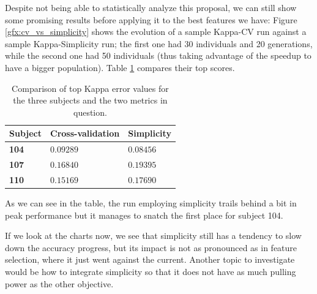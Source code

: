 	Despite not being able to statistically analyze this proposal, we can still show some promising results before applying it to the best features we have: Figure \ref{gfx:cv_vs_simplicity} shows the evolution of a sample Kappa-CV run against a sample Kappa-Simplicity run; the first one had 30 individuals and 20 generations, while the second one had 50 individuals (thus taking advantage of the speedup to have a bigger population). Table \ref{table:best_cv_vs_simplicity} compares their top scores.

	\vspace{0.3cm}

	\begin{table}[h]

        \centering
        \setlength\arrayrulewidth{0.8pt}

        \begin{tabular}{| >{\centering\arraybackslash}m{0.5in} | >{\centering\arraybackslash}m{1.2in} | >{\centering\arraybackslash}m{1.2in} |}

            \hline
            \rowcolor{RoyalBlue}
            \textbf{Subject} & \textbf{Cross-validation} & \textbf{Simplicity} \\
            \hline
            \textbf{104} & $0.09289$ & $0.08456$ \\
            \hline
            \textbf{107} & $0.16840$ & $0.19395$ \\
            \hline
            \textbf{110} & $0.15169$ & $0.17690$ \\
            \hline

        \end{tabular}

        \caption[Best Kappa values using cross-validation and simplicity]{Comparison of top Kappa error values for the three subjects and the two metrics in question.}\label{table:best_cv_vs_simplicity}

    \end{table}

\newpage

	As we can see in the table, the run employing simplicity trails behind a bit in peak performance but it manages to snatch the first place for subject 104.

	If we look at the charts now, we see that simplicity still has a tendency to slow down the accuracy progress, but its impact is not as pronounced as in feature selection, where it just went against the current. Another topic to investigate would be how to integrate simplicity so that it does not have as much pulling power as the other objective.

